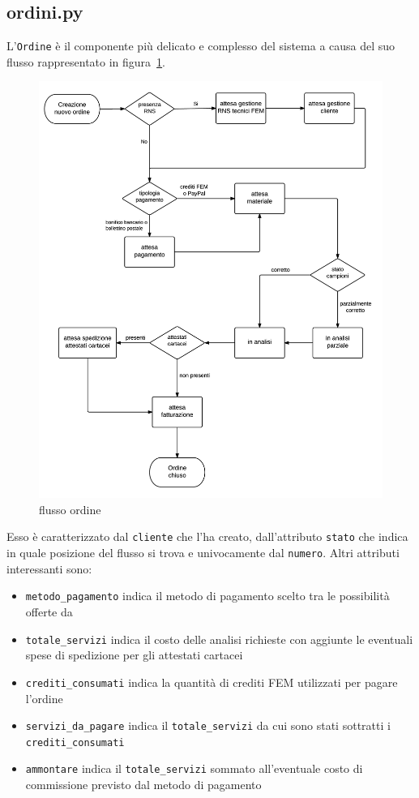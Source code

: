 \subsection*{ordini.py}
\label{subs:ordini}
L'\texttt{Ordine} è il componente più delicato e complesso del sistema a causa del suo flusso rappresentato in figura~\ref{fig:flusso-ordine}.

\begin{figure}
 \includegraphics[width=1\textwidth]{images/flusso-ordine} 
 \caption{flusso ordine}
 \label{fig:flusso-ordine}
\end{figure}

Esso è caratterizzato dal \texttt{cliente} che l'ha creato, dall'attributo \texttt{stato} che indica in quale posizione del flusso si trova e univocamente dal \texttt{numero}.
Altri attributi interessanti sono:
\begin{itemize}
 \item \texttt{metodo\_pagamento} indica il metodo di pagamento scelto tra le possibilità offerte da {\fem}
 \item \texttt{totale\_servizi} indica il costo delle analisi richieste con aggiunte le eventuali spese di spedizione per gli attestati cartacei 
 \item \texttt{crediti\_consumati} indica la quantità di crediti FEM utilizzati per pagare l'ordine
 \item \texttt{servizi\_da\_pagare} indica il \texttt{totale\_servizi} da cui sono stati sottratti i \texttt{crediti\_consumati}
 \item \texttt{ammontare} indica il \texttt{totale\_servizi} sommato all'eventuale costo di commissione previsto dal metodo di pagamento
\end{itemize}

